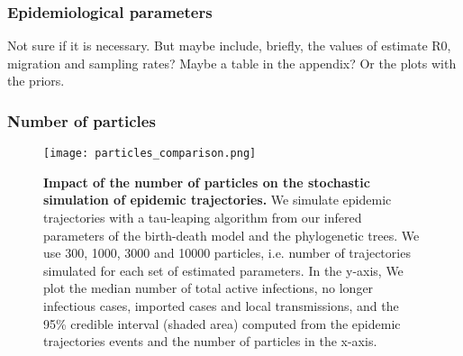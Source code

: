 \subsubsection*{Epidemiological parameters}

Not sure if it is necessary. But maybe include, briefly, the values of estimate R0, migration and sampling rates?
Maybe a table in the appendix? Or the plots with the priors.

\subsubsection*{Number of particles}

\begin{figure}[p]
    \centering
    \texttt{[image: particles\_comparison.png]}
    \caption{\textbf{Impact of the number of particles on the stochastic simulation of epidemic trajectories.} We simulate epidemic trajectories with a tau-leaping algorithm from our infered parameters of the birth-death model and the phylogenetic trees. We use 300, 1000, 3000 and 10000 particles, i.e. number of trajectories simulated for each set of estimated parameters. In the y-axis, We plot the median number of total active infections, no longer infectious cases, imported cases and local transmissions, and the 95\% credible interval (shaded area) computed from the epidemic trajectories events and the number of particles in the x-axis. }
    \label{fig:particles}
\end{figure}